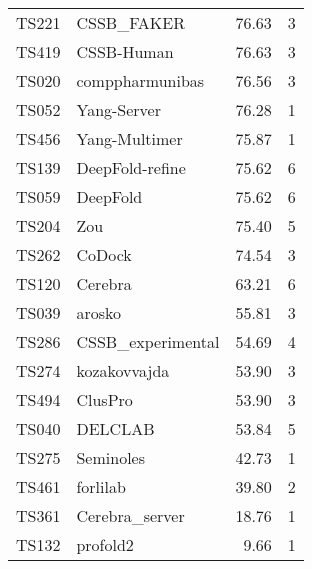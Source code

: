 \begin{table*}[ht]
\begin{minipage}[t]{0.48\textwidth}
\begin{tabular}{llrr}
TS221 & CSSB\_FAKER & 76.63 & 3 \\ 
TS419 & CSSB-Human & 76.63 & 3 \\ 
TS020 & comppharmunibas & 76.56 & 3 \\ 
TS052 & Yang-Server & 76.28 & 1 \\ 
TS456 & Yang-Multimer & 75.87 & 1 \\ 
TS139 & DeepFold-refine & 75.62 & 6 \\ 
TS059 & DeepFold & 75.62 & 6 \\ 
TS204 & Zou & 75.40 & 5 \\ 
TS262 & CoDock & 74.54 & 3 \\ 
TS120 & Cerebra & 63.21 & 6 \\ 
TS039 & arosko & 55.81 & 3 \\ 
TS286 & CSSB\_experimental & 54.69 & 4 \\ 
TS274 & kozakovvajda & 53.90 & 3 \\ 
TS494 & ClusPro & 53.90 & 3 \\ 
TS040 & DELCLAB & 53.84 & 5 \\ 
TS275 & Seminoles & 42.73 & 1 \\ 
TS461 & forlilab & 39.80 & 2 \\ 
TS361 & Cerebra\_server & 18.76 & 1 \\ 
TS132 & profold2 & 9.66 & 1 \\ 
\bottomrule
\end{tabular}
\end{minipage}
\end{table*}
